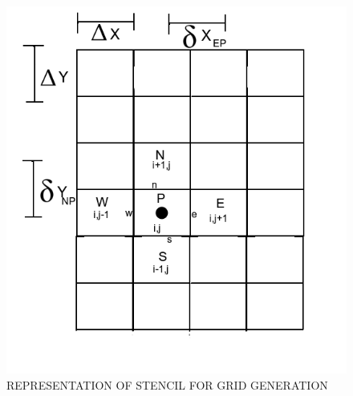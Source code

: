 \documentclass[cleanfoot,cleanhead,twocolumn,10pt,notitlepage]{asme2e}
\begin{document}

%
%



\begin{figure}[t]
\begin{center}
    \includegraphics[width=\linewidth]{Stencil.png}
    \caption{REPRESENTATION OF STENCIL FOR GRID GENERATION}
    \label{fig:stencil}
\end{center}
\end{figure}
\end{document}

